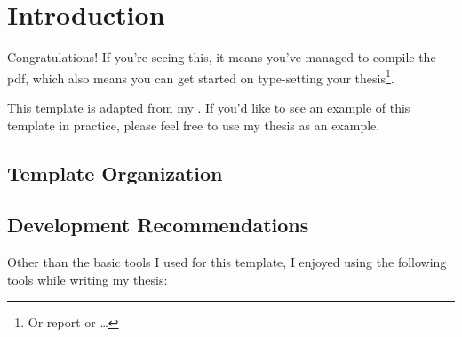 \chapter{Introduction}
\label{chap:introduction}

Congratulations! If you're seeing this, it means you've managed to compile the
\acs{pdf}, which also means you can get started on type-setting your
thesis\footnote{Or report or \ldots{}}.

This template is adapted from my
.
If you'd like to see an example of this template in practice, please feel free
to use my thesis as an example.

\section{Template Organization}
\label{chap:introduction:sec:template-organization}


\section{Development Recommendations}
\label{chap:introduction:sec:development-recommendations}

Other than the basic tools I used for this template, I enjoyed using the
following tools while writing my thesis:

